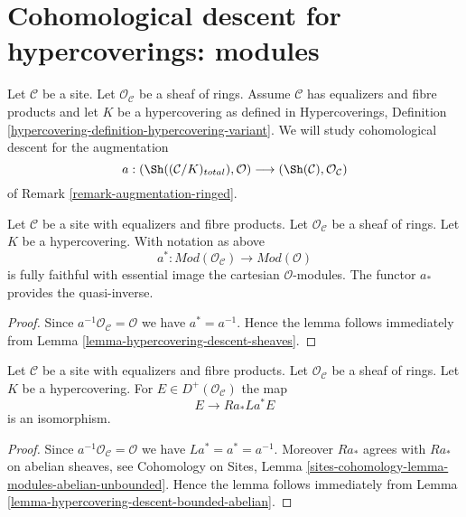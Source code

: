\section{Cohomological descent for hypercoverings: modules}
\label{section-cohomological-descent-hypercoverings-modules}

\noindent
Let $\mathcal{C}$ be a site. Let $\mathcal{O}_\mathcal{C}$
be a sheaf of rings. Assume $\mathcal{C}$
has equalizers and fibre products and let $K$ be a hypercovering
as defined in Hypercoverings, Definition
\ref{hypercovering-definition-hypercovering-variant}. We will study
cohomological descent for the augmentation
$$
a :
(\Sh((\mathcal{C}/K)_{total}), \mathcal{O})
\longrightarrow
(\Sh(\mathcal{C}), \mathcal{O}_\mathcal{C})
$$
of Remark \ref{remark-augmentation-ringed}.

\begin{lemma}
\label{lemma-hypercovering-descent-modules}
Let $\mathcal{C}$ be a site with equalizers and fibre products.
Let $\mathcal{O}_\mathcal{C}$ be a sheaf of rings.
Let $K$ be a hypercovering. With notation as above
$$
a^* : \textit{Mod}(\mathcal{O}_\mathcal{C}) \to \textit{Mod}(\mathcal{O})
$$
is fully faithful with essential image the cartesian $\mathcal{O}$-modules.
The functor $a_*$ provides the quasi-inverse.
\end{lemma}

\begin{proof}
Since $a^{-1}\mathcal{O}_\mathcal{C} = \mathcal{O}$ we have
$a^* = a^{-1}$. Hence the lemma follows
immediately from Lemma \ref{lemma-hypercovering-descent-sheaves}.
\end{proof}

\begin{lemma}
\label{lemma-hypercovering-descent-bounded-modules}
Let $\mathcal{C}$ be a site with equalizers and fibre products.
Let $\mathcal{O}_\mathcal{C}$ be a sheaf of rings.
Let $K$ be a hypercovering. For
$E \in D^+(\mathcal{O}_\mathcal{C})$ the map
$$
E \longrightarrow Ra_*La^*E
$$
is an isomorphism.
\end{lemma}

\begin{proof}
Since $a^{-1}\mathcal{O}_\mathcal{C} = \mathcal{O}$ we have
$La^* = a^* = a^{-1}$. Moreover $Ra_*$ agrees with
$Ra_*$ on abelian sheaves, see
Cohomology on Sites, Lemma
\ref{sites-cohomology-lemma-modules-abelian-unbounded}.
Hence the lemma follows
immediately from Lemma \ref{lemma-hypercovering-descent-bounded-abelian}.
\end{proof}

